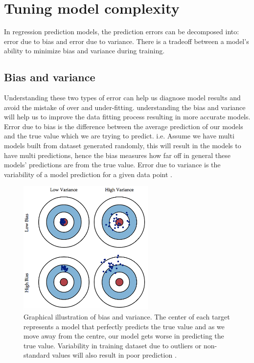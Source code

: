 \section{Tuning model complexity}
\label{comp}
In regression prediction models, the prediction errors can be decomposed into: error due to bias and error due to variance. There is a tradeoff between a model's ability to minimize bias and variance during training. 
\subsection{Bias and variance }
Understanding these two types of error can help us diagnose model results and avoid the mistake of over and under-fitting. understanding the bias and variance will help us to improve the data fitting process resulting in more accurate models.
Error due to bias is the difference between the average prediction of our models and the true value which we are trying to predict. i.e. Assume we have multi models built from dataset generated randomly, this will result in the models to have multi predictions, hence the bias measures how far off in general these models' predictions are from the true value. Error due to variance is the variability of a model prediction for a given data point \citep{fortmann2012understanding}. 

\begin{figure}[H]
  \centering
    \includegraphics[width=0.6\textwidth]{images/Bias.png}
    \caption{Graphical illustration of bias and variance. The center of each target represents a model that perfectly predicts the true value and as we move away from the centre, our model gets worse in predicting the true value. Variability in training dataset due to outliers or non-standard values will also result in poor prediction \citep{fortmann2012understanding}.}
  \label{RC}
 \end{figure}
 
